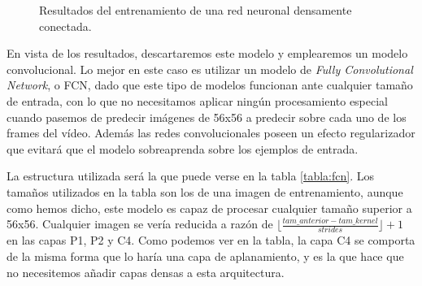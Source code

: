 \begin{figure}[h]
  \centering
  \caption{Resultados del entrenamiento de una red neuronal densamente conectada.}
  \label{fig:dense}
\end{figure}

En vista de los resultados, descartaremos este modelo y emplearemos un modelo convolucional. Lo mejor en este caso es utilizar un modelo de \textit{Fully Convolutional Network}, o FCN, dado que este tipo de modelos funcionan ante cualquier tamaño de entrada, con lo que no necesitamos aplicar ningún procesamiento especial cuando pasemos de predecir imágenes de 56x56 a predecir sobre cada uno de los frames del vídeo. Además las redes convolucionales poseen un efecto regularizador que evitará que el modelo sobreaprenda sobre los ejemplos de entrada.

La estructura utilizada será la que puede verse en la tabla \ref{tabla:fcn}. Los tamaños utilizados en la tabla son los de una imagen de entrenamiento, aunque como hemos dicho, este modelo es capaz de procesar cualquier tamaño superior a 56x56. Cualquier imagen se vería reducida a razón de $\lfloor\frac{tam\_anterior - tam\_kernel}{strides}\rfloor+1$ en las capas P1, P2 y C4. Como podemos ver en la tabla, la capa C4 se comporta de la misma forma que lo haría una capa de aplanamiento, y es la que hace que no necesitemos añadir capas densas a esta arquitectura.


